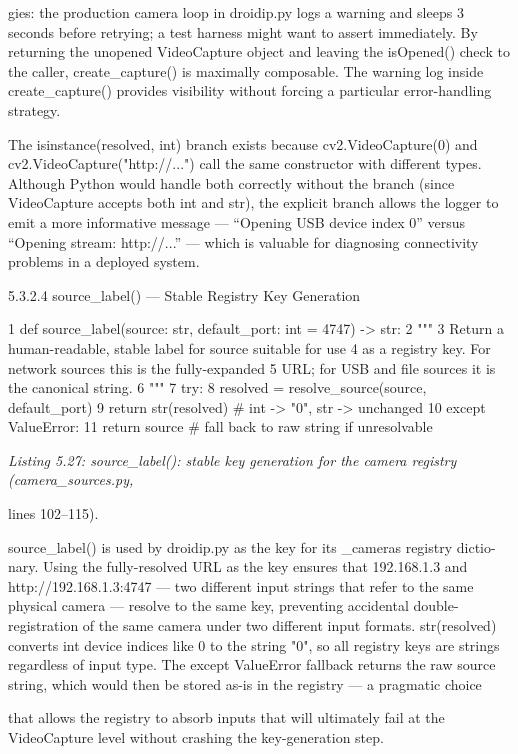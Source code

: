 gies: the production camera loop in droidip.py logs a warning and sleeps 3 seconds
before retrying; a test harness might want to assert immediately. By returning the unopened
VideoCapture object and leaving the isOpened() check to the caller, create\_capture()
is maximally composable. The warning log inside create\_capture() provides visibility
without forcing a particular error-handling strategy.

The isinstance(resolved, int) branch exists because cv2.VideoCapture(0)
and cv2.VideoCapture("http://...") call the same constructor with different types.
Although Python would handle both correctly without the branch (since VideoCapture
accepts both int and str), the explicit branch allows the logger to emit a more informative
message --- ``Opening USB device index 0'' versus ``Opening stream: http://...'' --- which is
valuable for diagnosing connectivity problems in a deployed system.


5.3.2.4 source\_label() --- Stable Registry Key Generation

1 def source\_label(source: str, default\_port: int = 4747) -> str:
2 """
3 Return a human-readable, stable label for source suitable for use
4 as a registry key. For network sources this is the fully-expanded
5 URL; for USB and file sources it is the canonical string.
6 """
7 try:
8 resolved = resolve\_source(source, default\_port)
9 return str(resolved) \# int -> "0", str -> unchanged
10 except ValueError:
11 return source \# fall back to raw string if unresolvable


\textit{Listing 5.27: source\_label(): stable key generation for the camera registry (camera\_sources.py,}

lines 102--115).


source\_label() is used by droidip.py as the key for its \_cameras registry dictio-
nary. Using the fully-resolved URL as the key ensures that 192.168.1.3 and http://192.168.1.3:4747
--- two different input strings that refer to the same physical camera --- resolve to the same
key, preventing accidental double-registration of the same camera under two different input
formats. str(resolved) converts int device indices like 0 to the string "0", so all registry
keys are strings regardless of input type. The except ValueError fallback returns the
raw source string, which would then be stored as-is in the registry --- a pragmatic choice



that allows the registry to absorb inputs that will ultimately fail at the VideoCapture level
without crashing the key-generation step.


